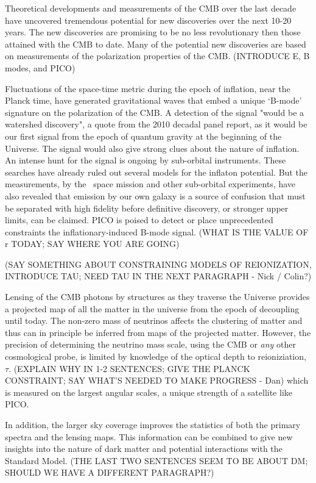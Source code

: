 \documentclass[PICOReport.tex]{subfiles}
\begin{document}

Theoretical developments and measurements of the \ac{CMB} over the last decade 
have uncovered tremendous potential for new discoveries over the next 10-20 years. The new discoveries are promising to be 
no less revolutionary then those attained with the CMB to date. Many of the potential new discoveries are based on 
measurements of the polarization properties of the \ac{CMB}.  (INTRODUCE E, B modes, and PICO)

Fluctuations of the space-time metric during the epoch of inflation, near the Planck time, have generated gravitational waves that embed a 
unique `B-mode' signature on the polarization of the CMB. A detection of the signal "would be a watershed discovery", a quote
from the 2010 decadal panel report, as it would be our first signal from the epoch of quantum gravity at the beginning of the Universe. 
The signal would also give strong clues about the nature of inflation. 
An intense hunt for the signal is ongoing by sub-orbital instruments. These searches have already ruled out several 
models for the inflaton potential. But the measurements, by the \planck\ space mission and other sub-orbital experiments, have also 
revealed that emission by our own galaxy is a source of confusion that must be separated with high fidelity before definitive discovery, or 
stronger upper limits, can be claimed. PICO is poised to detect or place unprecedented constraints the inflationary-induced 
B-mode signal. (WHAT IS THE VALUE OF r TODAY; SAY WHERE YOU ARE GOING)

(SAY SOMETHING ABOUT CONSTRAINING MODELS OF REIONIZATION, INTRODUCE TAU; NEED TAU IN THE 
NEXT PARAGRAPH - Nick / Colin?)

Lensing of the CMB photons by structures as they traverse the Universe provides a projected map of all the matter 
in the universe from the epoch of decoupling until today. 
The non-zero mass of neutrinos affects the clustering of matter and thus can in principle be inferred from maps of the 
projected matter. However, the precision of determining the neutrino mass scale, using the CMB or {\it any} other 
cosmological probe, is limited by knowledge of the optical depth to reioniziation, $\tau$. (EXPLAIN WHY IN 1-2 SENTENCES; 
GIVE THE PLANCK CONSTRAINT; SAY WHAT'S NEEDED TO MAKE PROGRESS - Dan) 
which is measured on the largest angular scales, a unique strength of a satellite like PICO.  

In addition, the larger sky coverage improves the statistics of both the primary spectra and the lensing maps.  
This information can be combined to give new insights into the nature of dark matter and potential interactions 
with the Standard Model. (THE LAST TWO SENTENCES SEEM TO BE ABOUT DM; SHOULD WE HAVE A DIFFERENT 
PARAGRAPH?)
\end{document}
